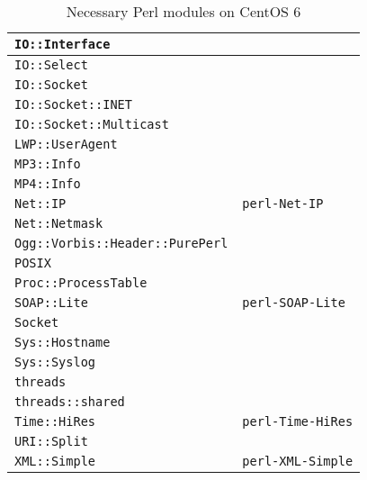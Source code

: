 \begin{table}
\begin{tabular}{|p{15em}|p{18em}|}
		\hline
		\verb|IO::Interface| 									& \\
		\hline
		\verb|IO::Select| 										& \\
		\hline
		\verb|IO::Socket| 										& \\
		\hline
		\verb|IO::Socket::INET| 							& \\
		\hline
		\verb|IO::Socket::Multicast| 					& \\
		\hline
		\verb|LWP::UserAgent| 								& \\
		\hline
		\verb|MP3::Info| 											& \\
		\hline
		\verb|MP4::Info| 											& \\
		\hline
		\verb|Net::IP| 												& \verb|perl-Net-IP| \\
		\hline
		\verb|Net::Netmask| 									& \\
		\hline
		\verb|Ogg::Vorbis::Header::PurePerl| 	& \\
		\hline
		\verb|POSIX| 													& \\
		\hline
		\verb|Proc::ProcessTable| 						& \\
		\hline
		\verb|SOAP::Lite| 										& \verb|perl-SOAP-Lite| \\
		\hline
		\verb|Socket| 												& \\
		\hline
		\verb|Sys::Hostname| 									& \\
		\hline
		\verb|Sys::Syslog| 										& \\
		\hline
		\verb|threads| 												& \\
		\hline
		\verb|threads::shared| 								& \\
		\hline
		\verb|Time::HiRes|										& \verb|perl-Time-HiRes| \\
		\hline
		\verb|URI::Split| 										& \\
		\hline
		\verb|XML::Simple| 										& \verb|perl-XML-Simple| \\
		\hline
	\end{tabular}
	\caption{Necessary Perl modules on CentOS 6}
	\label{tab:NecessaryPerlModulesCentOS6}
\end{table}

